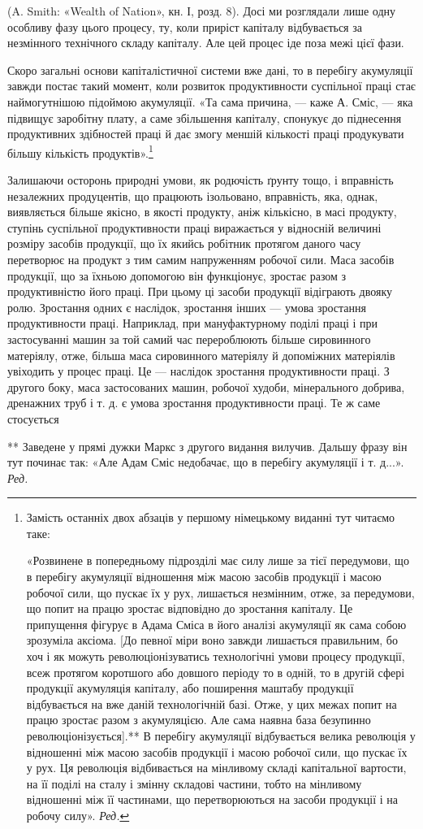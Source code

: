\parcont{}  %
(A. Smith: «Wealth of Nation», кн. І, розд. 8). Досі ми розглядали
лише одну особливу фазу цього процесу, ту, коли приріст капіталу
відбувається за незмінного технічного складу капіталу.
Але цей процес іде поза межі цієї фази.

Скоро загальні основи капіталістичної системи вже дані, то
в перебігу акумуляції завжди постає такий момент, коли розвиток
продуктивности суспільної праці стає наймогутнішою
підоймою акумуляції. «Та сама причина, — каже А. Сміс, —
яка підвищує заробітну плату, а саме збільшення капіталу,
спонукує до піднесення продуктивних здібностей праці й дає
змогу меншій кількості праці продукувати більшу кількість
продуктів».\footnote*{
Замість останніх двох абзаців у першому німецькому виданні
тут читаємо таке:

«Розвинене в попередньому підрозділі має силу лише за тієї передумови,
що в перебігу акумуляції відношення між масою засобів продукції і
масою робочої сили, що пускає їх у рух, лишається незмінним, отже,
за передумови, що попит на працю зростає відповідно до зростання капіталу.
Це припущення фігурує в Адама Сміса в його аналізі акумуляції
як сама собою зрозуміла аксіома. [До певної міри воно завжди лишається
правильним, бо хоч і як можуть революціонізуватись технологічні умови
процесу продукції, всеж протягом коротшого або довшого періоду то в одній,
то в другій сфері продукції акумуляція капіталу, або поширення маштабу
продукції відбувається на вже даній технологічній базі. Отже, у цих межах
попит на працю зростає разом з акумуляцією. Але сама наявна база
безупинно революціонізується].** В перебігу акумуляції відбувається
велика революція у відношенні між масою засобів продукції і масою робочої
сили, що пускає їх у рух. Ця революція відбивається на мінливому
складі капітальної вартости, на її поділі на сталу і змінну складові частини,
тобто на мінливому відношенні між її частинами, що перетворюються
на засоби продукції і на робочу силу». \emph{Ред.}
}

Залишаючи осторонь природні умови, як родючість ґрунту
тощо, і вправність незалежних продуцентів, що працюють ізольовано,
вправність, яка, однак, виявляється більше якісно, в якості
продукту, аніж кількісно, в масі продукту, ступінь суспільної
продуктивности праці виражається у відносній величині розміру
засобів продукції, що їх якийсь робітник протягом даного часу
перетворює на продукт з тим самим напруженням робочої сили.
Маса засобів продукції, що за їхньою допомогою він функціонує,
зростає разом з продуктивністю його праці. При цьому ці засоби
продукції відіграють двояку ролю. Зростання одних є наслідок,
зростання інших — умова зростання продуктивности праці.
Наприклад, при мануфактурному поділі праці і при застосуванні
машин за той самий час перероблюють більше сировинного матеріялу,
отже, більша маса сировинного матеріялу й допоміжних
матеріялів увіходить у процес праці. Це — наслідок зростання
продуктивности праці. З другого боку, маса застосованих машин,
робочої худоби, мінерального добрива, дренажних труб і т. д.
є умова зростання продуктивности праці. Те ж саме стосується

** Заведене у прямі дужки Маркс з другого видання вилучив. Дальшу
фразу він тут починає так: «Але Адам Сміс недобачає, що в перебігу
акумуляції і т. д...». \emph{Ред.}
\parbreak{}  %
